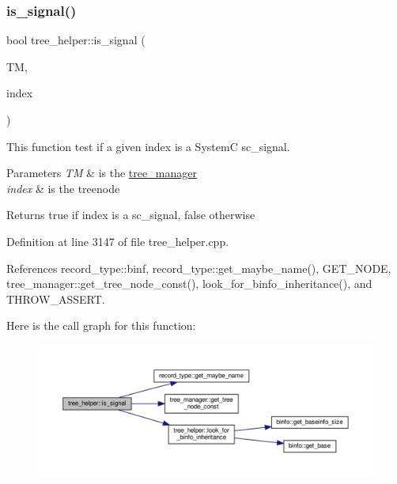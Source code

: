 \subsubsection{\texorpdfstring{is\+\_\+signal()}{is\_signal()}}
{\footnotesize\ttfamily bool tree\+\_\+helper\+::is\+\_\+signal (\begin{DoxyParamCaption}\item[{const \hyperlink{tree__manager_8hpp_a792e3f1f892d7d997a8d8a4a12e39346}{tree\+\_\+manager\+Const\+Ref} \&}]{TM,  }\item[{const unsigned int}]{index }\end{DoxyParamCaption})\hspace{0.3cm}{\ttfamily [static]}}



This function test if a given index is a SystemC sc\+\_\+signal. 


\begin{DoxyParams}{Parameters}
{\em TM} & is the \hyperlink{classtree__manager}{tree\+\_\+manager} \\
\hline
{\em index} & is the treenode \\
\hline
\end{DoxyParams}
\begin{DoxyReturn}{Returns}
true if index is a sc\+\_\+signal, false otherwise 
\end{DoxyReturn}


Definition at line 3147 of file tree\+\_\+helper.\+cpp.



References record\+\_\+type\+::binf, record\+\_\+type\+::get\+\_\+maybe\+\_\+name(), G\+E\+T\+\_\+\+N\+O\+DE, tree\+\_\+manager\+::get\+\_\+tree\+\_\+node\+\_\+const(), look\+\_\+for\+\_\+binfo\+\_\+inheritance(), and T\+H\+R\+O\+W\+\_\+\+A\+S\+S\+E\+RT.

Here is the call graph for this function\+:
\nopagebreak
\begin{figure}[H]
\begin{center}
\leavevmode
\includegraphics[width=350pt]{d7/d99/classtree__helper_a2fb7f7a48d5444d13e98ec948eb44ce1_cgraph}
\end{center}
\end{figure}
\mbox{\label{classtree__helper_a82b336f89ab98b3512e1cc607aef4825}} 
